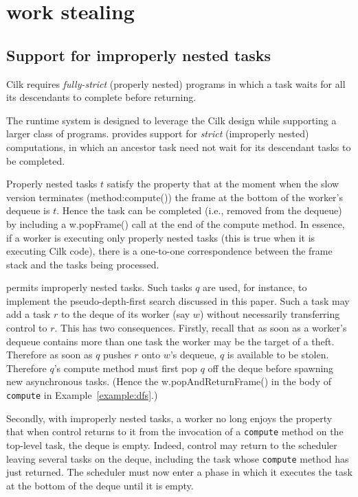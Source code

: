 \section{\Xten{} work stealing}\label{sec:XWS}

\subsection{Support for improperly nested tasks}
Cilk requires {\em fully-strict} (properly nested) programs in which a
task waits for all its descendants to complete before returning.

The \Xten{} runtime system is designed to leverage the Cilk design
while supporting a larger class of programs. \Xten{} provides support
for {\em strict} ({improperly nested}) computations, in which an
ancestor task need not wait for its descendant tasks to be completed.

Properly nested tasks $t$ satisfy the property that at the moment when
the slow version terminates (method:{\java compute()}) the frame at
the bottom of the worker's dequeue is $t$. Hence the task can be
completed (i.e., removed from the dequeue) by including a {\java
w.popFrame()} call at the end of the compute method. In essence, if a
worker is executing only properly nested tasks (this is true when it
is executing Cilk code), there is a one-to-one correspondence between
the frame stack and the tasks being processed.

\Xten{} permits improperly nested tasks. Such tasks $q$ are used, for
instance, to implement the pseudo-depth-first search discussed in this
paper. Such a task may add a task $r$ to the deque of its worker (say
$w$) without necessarily transferring control to $r$. This has two
consequences. Firstly, recall that as soon as a worker's dequeue
contains more than one task the worker may be the target of a
theft. Therefore as soon as $q$ pushes $r$ onto $w$'s dequeue, $q$ is
available to be stolen.  Therefore $q$'s compute method must first pop
$q$ off the deque before spawning new asynchronous tasks. (Hence the {\java
w.popAndReturnFrame()} in the body of {\tt compute} in
Example~\ref{example:dfs}.)

Secondly, with improperly nested tasks, a worker no long enjoys the property
that when control returns to it from the invocation of a {\tt compute}
method on the top-level task, the deque is empty. Indeed, control may
return to the scheduler leaving several tasks on the deque, including
the task whose {\tt compute} method has just returned. The scheduler must
now enter a phase in which it executes the task at the bottom of the
deque until it is empty.


